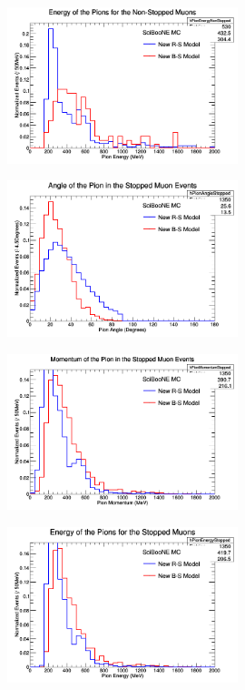 \documentclass[11pt]{article}
\begin{document}
\begin{figure}[H]
\centering
\includegraphics[width=0.6\textwidth]{ANMPionPlottingImages/3-ANMPionPlotting.png}
\caption{}
\end{figure}

\begin{figure}[H]
\centering
\includegraphics[width=0.6\textwidth]{ANMPionPlottingImages/4-ANMPionPlotting.png}
\caption{}
\end{figure}

\begin{figure}[H]
\centering
\includegraphics[width=0.6\textwidth]{ANMPionPlottingImages/5-ANMPionPlotting.png}
\caption{}
\end{figure}

\begin{figure}[H]
\centering
\includegraphics[width=0.6\textwidth]{ANMPionPlottingImages/6-ANMPionPlotting.png}
\caption{}
\end{figure}
\end{document}
